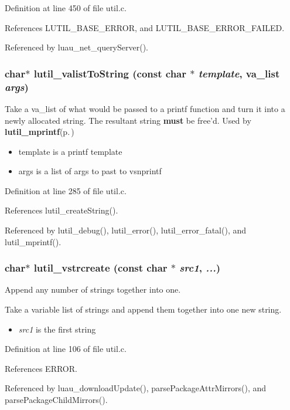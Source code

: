 Definition at line 450 of file util.c.

References LUTIL\_\-BASE\_\-ERROR, and LUTIL\_\-BASE\_\-ERROR\_\-FAILED.

Referenced by luau\_\-net\_\-query\-Server().
\subsubsection{\setlength{\rightskip}{0pt plus 5cm}char$\ast$ lutil\_\-valist\-To\-String (const char $\ast$ {\em template}, va\_\-list {\em args})}\label{util_8h_a17}


Take a va\_\-list of what would be passed to a printf function and turn it into a newly allocated string. The resultant string {\bf must} be free'd. Used by {\bf lutil\_\-mprintf}{\rm (p.\,\pageref{util_8h_a14})}

\begin{itemize}
\item template is a printf template \item args is a list of args to past to vsnprintf 
\end{itemize}


Definition at line 285 of file util.c.

References lutil\_\-create\-String().

Referenced by lutil\_\-debug(), lutil\_\-error(), lutil\_\-error\_\-fatal(), and lutil\_\-mprintf().
\subsubsection{\setlength{\rightskip}{0pt plus 5cm}char$\ast$ lutil\_\-vstrcreate (const char $\ast$ {\em src1},  {\em ...})}\label{util_8h_a13}


Append any number of strings together into one. 

Take a variable list of strings and append them together into one new string.

\begin{itemize}
\item {\em src1\/} is the first string 
\end{itemize}


Definition at line 106 of file util.c.

References ERROR.

Referenced by luau\_\-download\-Update(), parse\-Package\-Attr\-Mirrors(), and parse\-Package\-Child\-Mirrors().